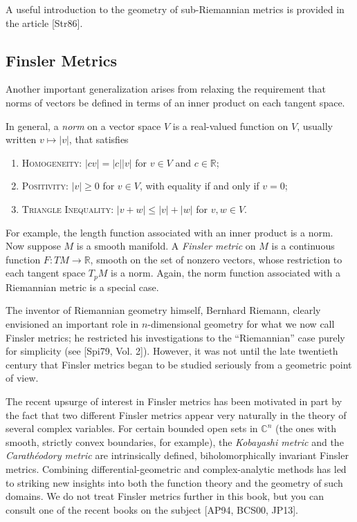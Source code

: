 A useful introduction to the geometry of sub-Riemannian metrics is provided in the article [Str86].

\subsection{Finsler Metrics}

Another important generalization arises from relaxing the requirement that norms of vectors be defined in terms of an inner product on each tangent space.

In general, a \emph{norm} on a vector space $V$ is a real-valued function on $V$, usually written $v \mapsto |v|$, that satisfies
\begin{enumerate}
\item \textsc{Homogeneity}: $|cv| = |c||v|$ for $v \in V$ and $c \in \mathbb{R}$;
\item \textsc{Positivity}: $|v| \geq 0$ for $v \in V$, with equality if and only if $v = 0$;
\item \textsc{Triangle Inequality}: $|v + w| \leq |v| + |w|$ for $v, w \in V$.
\end{enumerate}

For example, the length function associated with an inner product is a norm. Now suppose $M$ is a smooth manifold. A \emph{Finsler metric} on $M$ is a continuous function $F: TM \to \mathbb{R}$, smooth on the set of nonzero vectors, whose restriction to each tangent space $T_pM$ is a norm. Again, the norm function associated with a Riemannian metric is a special case.

The inventor of Riemannian geometry himself, Bernhard Riemann, clearly envisioned an important role in $n$-dimensional geometry for what we now call Finsler metrics; he restricted his investigations to the ``Riemannian'' case purely for simplicity (see [Spi79, Vol. 2]). However, it was not until the late twentieth century that Finsler metrics began to be studied seriously from a geometric point of view.

The recent upsurge of interest in Finsler metrics has been motivated in part by the fact that two different Finsler metrics appear very naturally in the theory of several complex variables. For certain bounded open sets in $\mathbb{C}^n$ (the ones with smooth, strictly convex boundaries, for example), the \emph{Kobayashi metric} and the \emph{Carathéodory metric} are intrinsically defined, biholomorphically invariant Finsler metrics. Combining differential-geometric and complex-analytic methods has led to striking new insights into both the function theory and the geometry of such domains. We do not treat Finsler metrics further in this book, but you can consult one of the recent books on the subject [AP94, BCS00, JP13].

